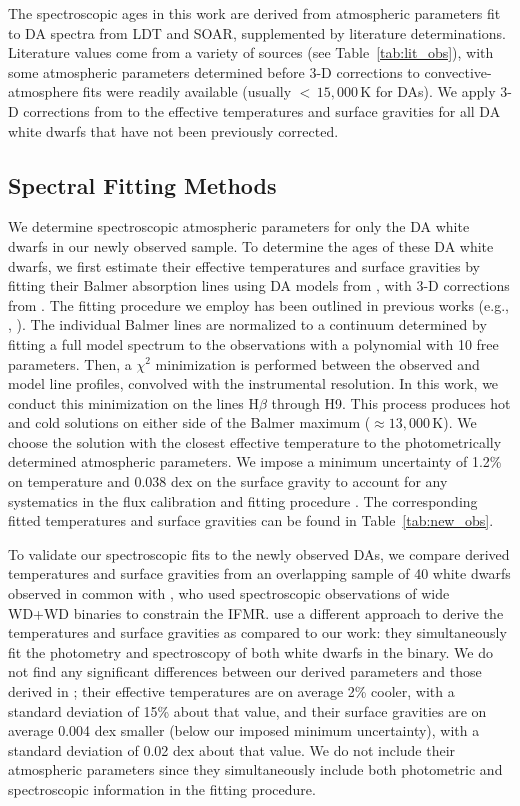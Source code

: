 \documentclass[twocolumn]{aastex631}
\begin{document}
The spectroscopic ages in this work are derived from atmospheric parameters fit to DA spectra from LDT and SOAR, supplemented by literature determinations. Literature values come from a variety of sources (see Table~\ref{tab:lit_obs}), with some atmospheric parameters determined before 3-D corrections to convective-atmosphere fits were readily available (usually $<$\,$15{,}000$\,K for DAs). We apply 3-D corrections from \cite{2013A&A...559A.104T} to the effective temperatures and surface gravities for all DA white dwarfs that have not been previously corrected.

\subsection{Spectral Fitting Methods} \label{sec:specfits}
We determine spectroscopic atmospheric parameters for only the DA white dwarfs in our newly observed sample. To determine the ages of these DA white dwarfs, we first estimate their effective temperatures and surface gravities by fitting their Balmer absorption lines using DA models from \cite{2011ApJ...730..128T}, with 3-D corrections from \cite{2013A&A...559A.104T}. The fitting procedure we employ has been outlined in previous works (e.g., \citealt{2011ApJ...743..138G},  \citealt{2020MNRAS.497..130T}). The individual Balmer lines are normalized to a continuum determined by fitting a full model spectrum to the observations with a polynomial with 10 free parameters. Then, a $\chi^{2}$ minimization is performed between the observed and model line profiles, convolved with the instrumental resolution. In this work, we conduct this minimization on the lines H$\beta$ through H9. This process produces hot and cold solutions on either side of the Balmer maximum ($\approx$$13{,}000$\,K). We choose the solution with the closest effective temperature to the photometrically determined atmospheric parameters. We impose a minimum uncertainty of 1.2\% on temperature and 0.038 dex on the surface gravity to account for any systematics in the flux calibration and fitting procedure \citep{2005ApJS..156...47L}. The corresponding fitted temperatures and surface gravities can be found in Table~\ref{tab:new_obs}.

To validate our spectroscopic fits to the newly observed DAs, we compare derived temperatures and surface gravities from an overlapping sample of 40 white dwarfs observed in common with \citet{2024MNRAS.527.9061H}, who used spectroscopic observations of wide WD+WD binaries to constrain the IFMR. \cite{2024MNRAS.527.9061H} use a different approach to derive the temperatures and surface gravities as compared to our work: they simultaneously fit the photometry and spectroscopy of both white dwarfs in the binary. We do not find any significant differences between our derived parameters and those derived in \cite{2024MNRAS.527.9061H}; their effective temperatures are on average 2\% cooler, with a standard deviation of 15\% about that value, and their surface gravities are on average 0.004 dex smaller (below our imposed minimum uncertainty), with a standard deviation of 0.02 dex about that value. We do not include their atmospheric parameters since they simultaneously include both photometric and spectroscopic information in the fitting procedure.
\end{document}
